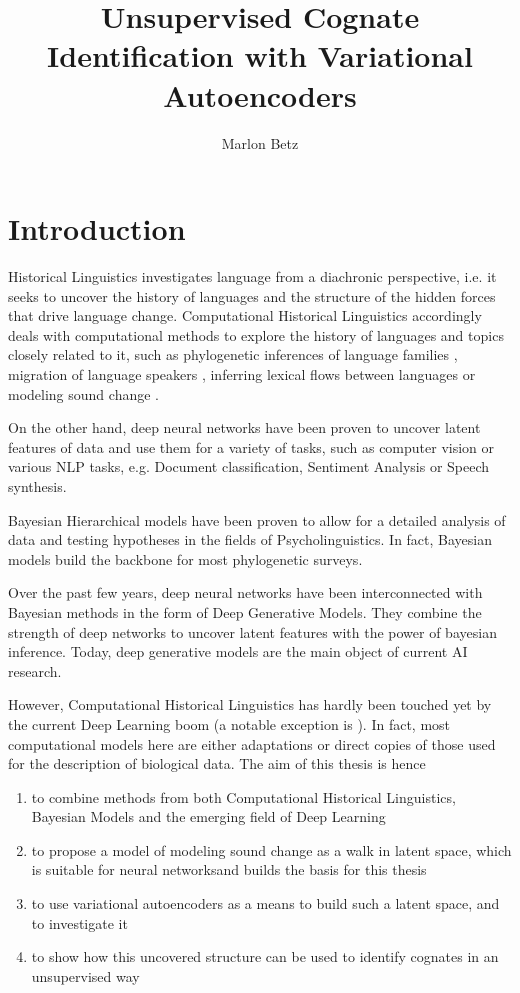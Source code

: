 \documentclass[6pt]{article}
\title{Unsupervised Cognate Identification with Variational Autoencoders}
\author{Marlon Betz}
\begin{document}
\maketitle
\newpage
\tableofcontents
\newpage

\section{Introduction}

Historical Linguistics investigates language from a diachronic perspective, i.e. it seeks to uncover the history of languages and the structure of the hidden forces that drive language change.  Computational Historical Linguistics accordingly deals with computational methods to explore the history of languages and topics closely related to it, such as phylogenetic inferences of language families \cite{bouckaert2012mapping}, migration of language speakers \cite{gray2009language}, inferring lexical flows between languages \cite{dellert2015uralic} or modeling sound change \cite{bouchard2013automated}.  

On the other hand, deep neural networks have been proven to uncover latent features of data and use them for a variety of tasks, such as computer vision or various NLP tasks, e.g. Document classification, Sentiment Analysis or Speech synthesis. 

Bayesian Hierarchical models have been proven to allow for a detailed analysis of data and testing hypotheses in the fields of Psycholinguistics. In fact, Bayesian models build the backbone for most phylogenetic surveys.

Over the past few years, deep neural networks have been interconnected with Bayesian methods in the form of Deep Generative Models. They combine the strength of deep networks to uncover latent features with the power of bayesian inference. Today, deep generative models are the main object of current AI research. 

 However, Computational Historical Linguistics has hardly been touched yet by the current Deep Learning boom (a notable exception is \cite{rama2016siamese}). 
 In fact, most computational models here are either adaptations or direct copies of those used for the description of biological data.
The aim of this thesis is hence 
\begin{enumerate}
\item to combine methods from both Computational Historical Linguistics, Bayesian Models and the emerging field of Deep Learning
\item to propose a model of modeling sound change as a walk in latent space, which is suitable for neural networksand builds the basis for this thesis
\item to use variational autoencoders as a means to build such a latent space, and to investigate it
\item to show how this uncovered structure can be used to identify cognates in an unsupervised way
\end{enumerate}
\end{document}
